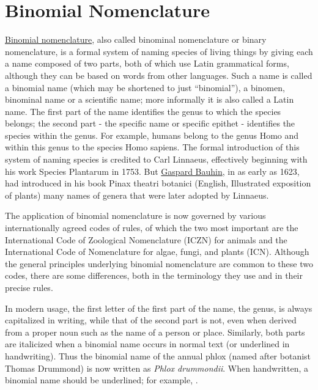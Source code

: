 \section{Binomial Nomenclature}\label{binomial-nomenclature}

\href{https://en.wikipedia.org/wiki/Binomial_nomenclature}{Binomial
nomenclature}, also called binominal nomenclature or binary
nomenclature, is a formal system of naming species of living things by
giving each a name composed of two parts, both of which use Latin
grammatical forms, although they can be based on words from other
languages. Such a name is called a binomial name (which may be shortened
to just ``binomial''), a binomen, binominal name or a scientific name;
more informally it is also called a Latin name. The first part of the
name identifies the genus to which the species belongs; the second part
- the specific name or specific epithet - identifies the species within
the genus. For example, humans belong to the genus Homo and within this
genus to the species Homo sapiens. The formal introduction of this
system of naming species is credited to Carl Linnaeus, effectively
beginning with his work Species Plantarum in 1753. But \href{https://en.wikipedia.org/wiki/Gaspard_Bauhin}{Gaspard Bauhin},
in as early as 1623, had introduced in his book Pinax theatri botanici
(English, Illustrated exposition of plants) many names of genera that
were later adopted by Linnaeus.

The application of binomial nomenclature is now governed by various
internationally agreed codes of rules, of which the two most important
are the International Code of Zoological Nomenclature (ICZN) for animals
and the International Code of Nomenclature for algae, fungi, and plants
(ICN). Although the general principles underlying binomial nomenclature
are common to these two codes, there are some differences, both in the
terminology they use and in their precise rules.

In modern usage, the first letter of the first part of the name, the
genus, is always capitalized in writing, while that of the second part
is not, even when derived from a proper noun such as the name of a
person or place. Similarly, both parts are italicized when a binomial
name occurs in normal text (or underlined in handwriting). Thus the
binomial name of the annual phlox (named after botanist Thomas Drummond)
is now written as \emph{Phlox drummondii}. When handwritten, a binomial name
should be underlined; for example, .

